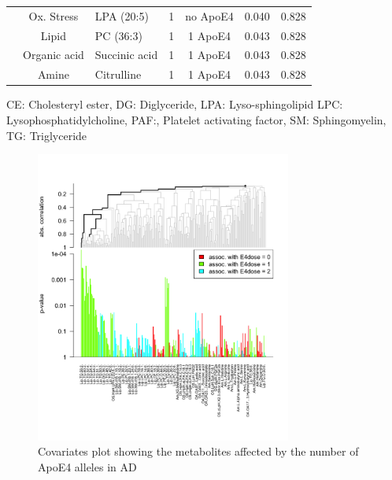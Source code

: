 \documentclass{amsart}
\begin{document}
\begin{table}
{\begin{threeparttable}
\begin{tabular}{cclccrr}
   & Ox. Stress & LPA (20:5) & 1 & no ApoE4 & 0.040 & 0.828 \\
   & Lipid & PC (36:3) & 1 & 1 ApoE4 & 0.043 & 0.828 \\
   & Organic acid & Succinic acid & 1 & 1 ApoE4 & 0.043 & 0.828 \\
   & Amine & Citrulline & 1 & 1 ApoE4 & 0.043 & 0.828 \\   \bottomrule  
  \end{tabular}
  \begin{tablenotes}
    \item[] CE: Cholesteryl ester, DG: Diglyceride, LPA: Lyso-sphingolipid LPC: Lysophosphatidylcholine, PAF:, Platelet activating factor, SM: Sphingomyelin, TG: Triglyceride
  \end{tablenotes}
\end{threeparttable}}
  \end{table}


\begin{figure}[H]
    \includegraphics[width=0.75\textwidth]{figures/gt2.png}
      \caption{Covariates plot showing the metabolites affected by the number of ApoE4 alleles in AD}
    \label{plot:gt}
  \end{figure}
\clearpage  
\end{document}
